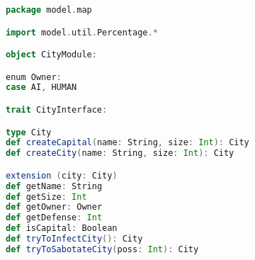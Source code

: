 \usepackage{listings}%

\begin{lstlisting}[language=Scala, label=code:example, caption= Questo è un codice di esempio]
package model.map

import model.util.Percentage.*

object CityModule:

enum Owner:
case AI, HUMAN

trait CityInterface:

type City
def createCapital(name: String, size: Int): City
def createCity(name: String, size: Int): City

extension (city: City)
def getName: String
def getSize: Int
def getOwner: Owner
def getDefense: Int
def isCapital: Boolean
def tryToInfectCity(): City
def tryToSabotateCity(poss: Int): City

\end{lstlisting}


